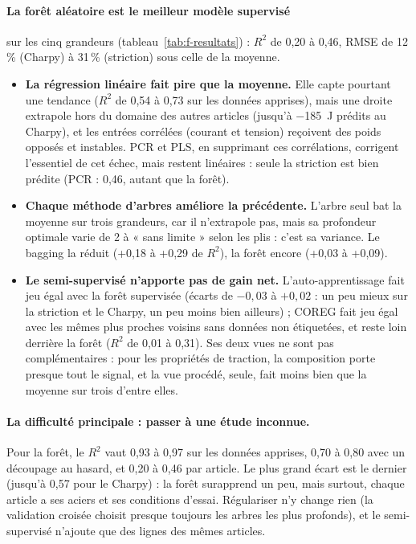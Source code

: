 \paragraph{La forêt aléatoire est le meilleur modèle supervisé} sur les cinq grandeurs
(tableau~\ref{tab:f-resultats}) : $R^2$ de 0,20 à 0,46, RMSE de 12\,\% (Charpy) à
31\,\% (striction) sous celle de la moyenne.
\begin{itemize}
  \item \textbf{La régression linéaire fait pire que la moyenne.} Elle capte pourtant une
    tendance ($R^2$ de 0,54 à 0,73 sur les données apprises), mais une droite extrapole
    hors du domaine des autres articles (jusqu'à \SI{-185}{\joule} prédits au Charpy), et
    les entrées corrélées (courant et tension) reçoivent des poids opposés et instables.
    PCR et PLS, en supprimant ces corrélations, corrigent l'essentiel de cet échec, mais
    restent linéaires : seule la striction est bien prédite (PCR : 0,46, autant que la
    forêt).
  \item \textbf{Chaque méthode d'arbres améliore la précédente.} L'arbre seul bat la
    moyenne sur trois grandeurs, car il n'extrapole pas, mais sa profondeur optimale
    varie de 2 à « sans limite » selon les plis : c'est sa variance. Le bagging la
    réduit (+0,18 à +0,29 de $R^2$), la forêt encore (+0,03 à +0,09).
  \item \textbf{Le semi-supervisé n'apporte pas de gain net.} L'auto-apprentissage fait
    jeu égal avec la forêt supervisée (écarts de $-0{,}03$ à $+0{,}02$ : un peu mieux sur
    la striction et le Charpy, un peu moins bien ailleurs) ; COREG fait jeu égal avec les
    mêmes plus proches voisins sans données non étiquetées, et reste loin derrière la
    forêt ($R^2$ de 0,01 à 0,31). Ses deux vues ne sont pas complémentaires : pour les
    propriétés de traction, la composition porte presque tout le signal, et la vue
    procédé, seule, fait moins bien que la moyenne sur trois d'entre elles.
\end{itemize}

\paragraph{La difficulté principale : passer à une étude inconnue.} Pour la forêt, le
$R^2$ vaut 0,93 à 0,97 sur les données apprises, 0,70 à 0,80 avec un découpage au
hasard, et 0,20 à 0,46 par article. Le plus grand écart est le dernier (jusqu'à 0,57
pour le Charpy) : la forêt surapprend un peu, mais surtout, chaque article a ses aciers
et ses conditions d'essai. Régulariser n'y change rien (la validation croisée choisit presque
toujours les arbres les plus profonds), et le semi-supervisé n'ajoute que des lignes des mêmes
articles.

